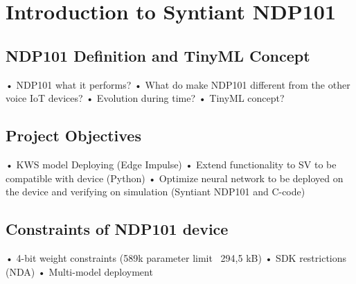 \chapter{Introduction to Syntiant NDP101}
\label{cha:intro}

\section{NDP101 Definition and TinyML Concept}
\label{sec:context}
• NDP101 what it performs?\newline
• What do make NDP101 different from the other voice IoT devices?\newline
• Evolution during time?\newline
• TinyML concept?\newline\newline

\section{Project Objectives}
• KWS model Deploying (Edge Impulse)\newline
• Extend functionality to SV to be compatible with device (Python)\newline
• Optimize neural network to be deployed on the device and verifying on simulation (Syntiant NDP101 and C-code)\newline\newline

\section{Constraints of NDP101 device}
\label{sec:problem}
• 4-bit weight constraints (589k parameter limit ~294,5 kB)\newline
• SDK restrictions (NDA)\newline
• Multi-model deployment\newline

\newpage
